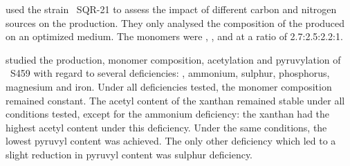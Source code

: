 %

\textcite{Raza2011} used the strain ~SQR-21 to assess the impact of different carbon and nitrogen sources on the \eps{} production. They only analysed the \eps{} composition of the \eps{} produced on an optimized medium. The monomers were \man{}, \gal{}, \glc{} and \glcua{} at a ratio of 2.7:2.5:2.2:1.

\textcite{Tait1986} studied the \eps{} production, monomer composition, acetylation and pyruvylation of ~S459 with regard to several deficiencies: \glc{}, ammonium, sulphur, phosphorus, magnesium and iron. Under all deficiencies tested, the monomer composition remained constant. The acetyl content of the xanthan remained stable under all conditions tested, except for the ammonium deficiency: the xanthan had the highest acetyl content under this deficiency. Under the same conditions, the lowest pyruvyl content was achieved. The only other deficiency which led to a slight reduction in pyruvyl content was sulphur deficiency.

